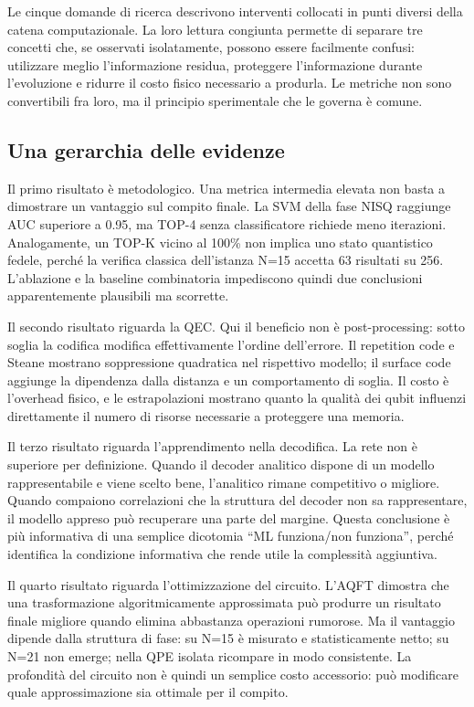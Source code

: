 Le cinque domande di ricerca descrivono interventi collocati in punti diversi della catena computazionale. La loro lettura congiunta permette di separare tre concetti che, se osservati isolatamente, possono essere facilmente confusi: utilizzare meglio l'informazione residua, proteggere l'informazione durante l'evoluzione e ridurre il costo fisico necessario a produrla. Le metriche non sono convertibili fra loro, ma il principio sperimentale che le governa è comune.

\subsection{Una gerarchia delle evidenze}\label{sec:finale_5_6_1}

Il primo risultato è metodologico. Una metrica intermedia elevata non basta a dimostrare un vantaggio sul compito finale. La SVM della fase NISQ raggiunge AUC superiore a 0.95, ma TOP-4 senza classificatore richiede meno iterazioni. Analogamente, un TOP-K vicino al 100\% non implica uno stato quantistico fedele, perché la verifica classica dell'istanza N=15 accetta 63 risultati su 256. L'ablazione e la baseline combinatoria impediscono quindi due conclusioni apparentemente plausibili ma scorrette.

Il secondo risultato riguarda la QEC. Qui il beneficio non è post-processing: sotto soglia la codifica modifica effettivamente l'ordine dell'errore. Il repetition code e Steane mostrano soppressione quadratica nel rispettivo modello; il surface code aggiunge la dipendenza dalla distanza e un comportamento di soglia. Il costo è l'overhead fisico, e le estrapolazioni mostrano quanto la qualità dei qubit influenzi direttamente il numero di risorse necessarie a proteggere una memoria.

Il terzo risultato riguarda l'apprendimento nella decodifica. La rete non è superiore per definizione. Quando il decoder analitico dispone di un modello rappresentabile e viene scelto bene, l'analitico rimane competitivo o migliore. Quando compaiono correlazioni che la struttura del decoder non sa rappresentare, il modello appreso può recuperare una parte del margine. Questa conclusione è più informativa di una semplice dicotomia ``ML funziona/non funziona'', perché identifica la condizione informativa che rende utile la complessità aggiuntiva.

Il quarto risultato riguarda l'ottimizzazione del circuito. L'AQFT dimostra che una trasformazione algoritmicamente approssimata può produrre un risultato finale migliore quando elimina abbastanza operazioni rumorose. Ma il vantaggio dipende dalla struttura di fase: su N=15 è misurato e statisticamente netto; su N=21 non emerge; nella QPE isolata ricompare in modo consistente. La profondità del circuito non è quindi un semplice costo accessorio: può modificare quale approssimazione sia ottimale per il compito.

